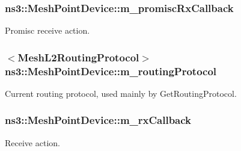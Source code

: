 \subsubsection[{\texorpdfstring{m\+\_\+promisc\+Rx\+Callback}{m_promiscRxCallback}}]{ ns3\+::\+Mesh\+Point\+Device\+::m\+\_\+promisc\+Rx\+Callback\hspace{0.3cm}{\ttfamily [private]}}\hypertarget{classns3_1_1MeshPointDevice_a9d8b17d5fc37167fea51c64d21c4f7eb}{}\label{classns3_1_1MeshPointDevice_a9d8b17d5fc37167fea51c64d21c4f7eb}


Promisc receive action. 

\subsubsection[{\texorpdfstring{m\+\_\+routing\+Protocol}{m_routingProtocol}}]{$<${\bf Mesh\+L2\+Routing\+Protocol}$>$ ns3\+::\+Mesh\+Point\+Device\+::m\+\_\+routing\+Protocol\hspace{0.3cm}{\ttfamily [private]}}\hypertarget{classns3_1_1MeshPointDevice_ac704fc10d4ed26d009f8bbfe71049d45}{}\label{classns3_1_1MeshPointDevice_ac704fc10d4ed26d009f8bbfe71049d45}


Current routing protocol, used mainly by Get\+Routing\+Protocol. 

\subsubsection[{\texorpdfstring{m\+\_\+rx\+Callback}{m_rxCallback}}]{ ns3\+::\+Mesh\+Point\+Device\+::m\+\_\+rx\+Callback\hspace{0.3cm}{\ttfamily [private]}}\hypertarget{classns3_1_1MeshPointDevice_a7655ae549d9f2faf860b4051259c6509}{}\label{classns3_1_1MeshPointDevice_a7655ae549d9f2faf860b4051259c6509}


Receive action. 

